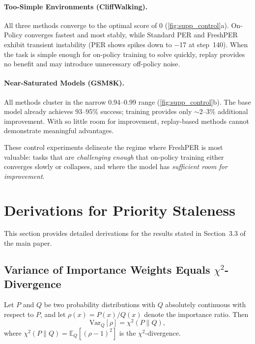 \documentclass[runningheads]{llncs}
\newcommand{\method}{FreshPER}
\begin{document}
\paragraph{Too-Simple Environments (CliffWalking).}
All three methods converge to the optimal score of 0 (\cref{fig:supp_control}a). On-Policy converges fastest and most stably, while Standard PER and \method{} exhibit transient instability (PER shows spikes down to $-$17 at step~140). When the task is simple enough for on-policy training to solve quickly, replay provides no benefit and may introduce unnecessary off-policy noise.

\paragraph{Near-Saturated Models (GSM8K).}
All methods cluster in the narrow 0.94--0.99 range (\cref{fig:supp_control}b). The base model already achieves 93--95\% success; training provides only ${\sim}$2--3\% additional improvement. With so little room for improvement, replay-based methods cannot demonstrate meaningful advantages.

These control experiments delineate the regime where \method{} is most valuable: tasks that are \emph{challenging enough} that on-policy training either converges slowly or collapses, and where the model has \emph{sufficient room for improvement}.

\section{Derivations for Priority Staleness}
\label{app:staleness_derivation}

This section provides detailed derivations for the results stated in Section~3.3 of the main paper.

\subsection{Variance of Importance Weights Equals \texorpdfstring{$\chi^2$}{Chi-squared}-Divergence}
\label{app:var_chi2}

\begin{proposition}
\label{prop:var_chi2}
Let $P$ and $Q$ be two probability distributions with $Q$ absolutely continuous with respect to $P$, and let $\rho(x) = P(x)/Q(x)$ denote the importance ratio. Then
\begin{equation}
    \mathrm{Var}_{Q}[\rho] = \chi^2(P \| Q),
\end{equation}
where $\chi^2(P\|Q) = \mathbb{E}_Q\!\left[(\rho - 1)^2\right]$ is the $\chi^2$-divergence.
\end{proposition}
\end{document}
